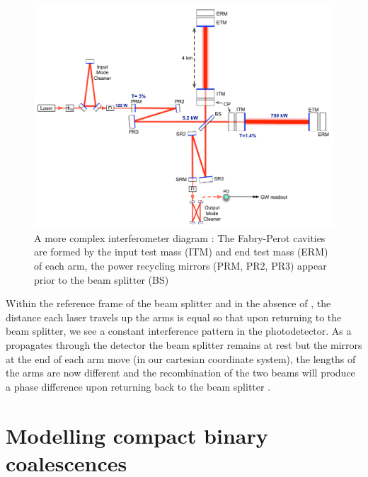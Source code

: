 \begin{figure}
   \includegraphics[width=\textwidth]{images/1_general_relativity/IFOdiagram.pdf}
   \caption{\label{fig:IFO}A more complex interferometer diagram \cite{aLIGO:2015}: The Fabry-Perot cavities are formed by the input test mass (ITM) and end test mass (ERM) of each arm, the power recycling mirrors (PRM, PR2, PR3) appear prior to the beam splitter (BS)}
\end{figure}

Within the reference frame of the beam splitter and in the absence of \gws, the distance each laser travels up the arms is equal so that upon returning to the beam splitter, we see a constant interference pattern in the photodetector.
As a \gw propagates through the detector the beam splitter remains at rest but the mirrors at the end of each arm move (in our cartesian coordinate system), the lengths of the arms are now different and the recombination of the two beams will produce a phase difference upon returning back to the beam splitter \cite{thorne_lecture}.










\section{\label{1:sec:CBC}Modelling compact binary coalescences}


















